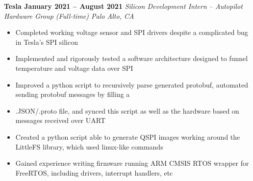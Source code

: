 \documentclass[../main.tex]{subfiles}
\begin{document}
%
\noindent\textbf{{\fontsize{\textFontSize}{\textFontBox}\selectfont Tesla \hfill January 2021 – August 2021}}
\vspace{\jobHeaderDist}\newline
%
{\fontsize{\textFontSize}{\textFontBox}\selectfont\emph{Silicon Development Intern – Autopilot Hardware Group (Full-time) \hfill Palo Alto, CA \hspace{0 cm}}}\newline
\vspace{\listHeight}
%
%
\begin{itemize}
  \setlength{\itemindent}{-6mm}
  \vspace{\listItemDist}\item {\fontsize{\textFontSize}{\textFontBox}\selectfont Completed working voltage sensor and SPI drivers despite a complicated bug in Tesla’s SPI silicon}
  \vspace{\listItemDistTwo}\item {\fontsize{\textFontSize}{\textFontBox}\selectfont Implemented and rigorously tested a software architecture designed to funnel temperature and voltage data over SPI}
  \vspace{\listItemDistTwo}\item {\fontsize{\textFontSize}{\textFontBox}\selectfont Improved a python script to recursively parse generated protobuf, automated sending protobuf messages by filling a}
  \vspace{\listItemDistTwo}\item {\fontsize{\textFontSize}{\textFontBox}\selectfont .JSON/.proto file, and synced this script as well as the hardware based on messages received over UART}
  \vspace{\listItemDistTwo}\item {\fontsize{\textFontSize}{\textFontBox}\selectfont Created a python script able to generate QSPI images working around the LittleFS library, which used linux-like commands} %
  \vspace{\listItemDistTwo}\item {\fontsize{\textFontSize}{\textFontBox}\selectfont Gained experience writing firmware running ARM CMSIS RTOS wrapper for FreeRTOS, including drivers, interrupt handlers, etc}
\end{itemize}
%
%
%
\end{document}
